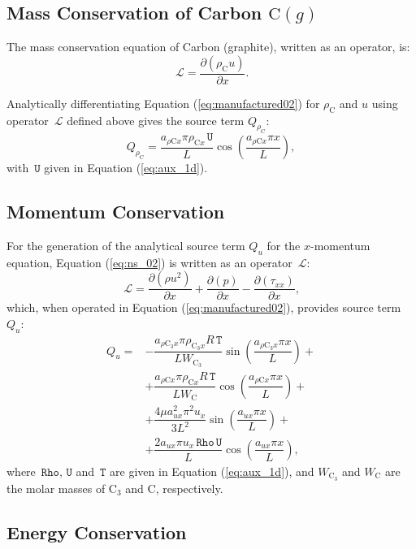 \documentclass[10pt]{article}
\newcommand{\Diff}[2] {\dfrac{\partial( #1)}{\partial #2}}
\newcommand{\Lo}{\,\mathcal{L}}
\newcommand{\Rho}{\,\mathtt{Rho}}
\newcommand{\T}{\,\mathtt{T}}
\newcommand{\U}{\,\mathtt{U}}
\newcommand{\C}{\text{C}}
\begin{document}
\subsection{Mass Conservation of Carbon $\C(g)$}

The mass conservation equation of Carbon (graphite), written as an operator, is:
\begin{equation*}
 \Lo= \Diff{\rho_{\C} u}{x}.
\end{equation*}

Analytically differentiating Equation (\ref{eq:manufactured02}) for $\rho_{\C}$ and $u$  using operator $\Lo$ defined above gives  the source term $Q_{\rho_{\C}}$:
\begin{equation}
Q_{\rho_{\C}} =  \dfrac{a_{ \rho \C x } \pi \rho_{\C x} \U }{L} \cos\left(\dfrac{a_{ \rho \C x } \pi x}{L}\right) ,
\end{equation}
with $\U$ given in Equation (\ref{eq:aux_1d}).


\subsection{Momentum Conservation}

For the generation of the analytical source term $Q_u$ for the $x$-momentum equation, Equation  (\ref{eq:ns_02}) is written as an  operator $\Lo$:
\begin{equation*}
 \Lo=\Diff{\rho u^2 }{x}+ \Diff{p}{x} -\Diff{\tau_{xx}}{x},
\end{equation*}
which, when operated in Equation (\ref{eq:manufactured02}), provides source term $Q_{u}$:
\begin{equation}
 \begin{split}
Q_u = &-\dfrac{a_{ \rho \C_3 x } \pi \rho_{\C_3 x} R \T}{L W_{\C_3}}\sin\left(\dfrac{a_{ \rho \C_3 x } \pi x}{L}\right) +\\ 
&+\dfrac{a_{ \rho \C x } \pi \rho_{\C x} R \T }{L W_{\C}} \cos\left(\dfrac{a_{ \rho \C x } \pi x}{L}\right) +\\ 
&+\dfrac{4\mu a_{ux}^2 \pi^2 u_x }{3L^2}\sin\left(\dfrac{a_{ux} \pi x}{L}\right) +\\ 
&+\dfrac{2 a_{ux} \pi u_x \Rho \U }{L} \cos\left(\dfrac{a_{ux} \pi x}{L}\right),
 \end{split}
\end{equation}
where $\Rho, \U$ and $ \T$ are given in Equation (\ref{eq:aux_1d}), and $ W_{\C_3}$ and  $W_{\C}$ are the molar masses of $\C_3$ and C, respectively.


\subsection{Energy Conservation}
\end{document}
